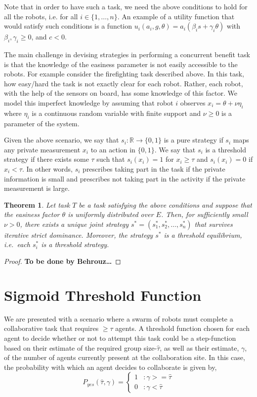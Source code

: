\documentclass[conference]{ieeeconf}
\newtheorem{theorem}{Theorem}
\def\R{\mathbb{R}}
\def\estt{\hat{\tau}}
\def\estg{\gamma}
\begin{document}
Note that in order to have such a task, we need the above conditions to hold for all the robots, i.e. for all $i\in\{1,\ldots,n\}$.
An example of a utility function that would satisfy such conditions is a function $u_i(a_i,g,\theta)=a_i(\beta_is+\gamma_i\theta)$ with $\beta_i,\gamma_i\geq 0$, and $c<0$.

The main challenge in devising strategies in performing a concurrent benefit task is that the knowledge of the easiness parameter is not easily accessible to the robots. For example consider the firefighting task described above. In this task, how easy/hard the task is not exactly clear for each robot. Rather, each robot, with the help of the sensors on board, has some knowledge of this factor. We model this imperfect knowledge by assuming that robot $i$ observes $x_i=\theta+\nu \eta_i$ where $\eta_i$ is a continuous random variable with finite support and $\nu\geq 0$ is a parameter of the system. 


Given the above scenario, we say that $s_i:\R\to \{0,1\}$ is a pure strategy if  $s_i$ maps any private measurement $x_i$ to an action in $\{0,1\}$. We say that $s_i$ is a threshold strategy if there exists some $\tau$ such that $s_i(x_i)=1$ for $x_i\geq \tau$ and $s_i(x_i)=0$ if $x_i<\tau$. In other words, $s_i$ prescribes taking part in the task if the private information is small and prescribes not taking part in the activity if the private measurement is large. 

\begin{theorem}
Let task $T$ be a task satisfying the above conditions and suppose that the easiness factor $\theta$ is uniformly distributed over $E$. Then, for sufficiently small $\nu>0$, there exists a unique joint strategy $s^*=(s_1^*,s_2^*,\ldots,s_n^*)$ that survives iterative strict dominance. Moreover, the strategy $s^*$ is a threshold equilibrium, i.e.\ each $s_i^*$ is a threshold strategy.
\end{theorem}

\begin{proof}
\textbf{To be done by Behrouz\ldots}
\end{proof}

\section{Sigmoid Threshold Function}
We are presented with a scenario where a swarm of robots must complete a collaborative task that requires $\geq \tau$ agents. A threshold function chosen for each agent to decide whether or not to attempt this task could be a step-function based on their estimate of the required group size-$\estt$, as well as their estimate, $\estg$, of the number of agents currently present at the collaboration site. In this case, the probability with which an agent decides to collaborate is given by, 
\begin{equation}\label{eq:step}
	P_{yes}(\estt,\estg) = \left\{
	\begin{array}{ll}
		1 & : \estg >= \estt\\ 
		0 & : \estg < \estt
	\end{array}\right.
\end{equation}
\end{document}
